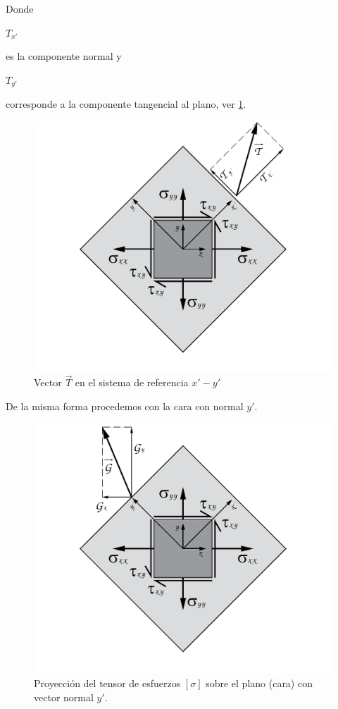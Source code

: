 \documentclass[12pt,letterpaper, twoside, openany]{article}
\begin{document}
%
Donde \begin{large} $T_{x'}$\end{large} es la componente normal y \begin{large} $T_{y'}$\end{large} corresponde a la componente tangencial al plano, ver \cref{fig:TPxpyp}.
%
\begin{figure}[H]
	\centering
		\includegraphics[width=12 cm]{img/Proyecta_CaraXpProXpYp.pdf}
		\caption{Vector $\overset{\rightarrow}{T}$ en el sistema de referencia $x'-y'$}
		\label{fig:TPxpyp}
\end{figure}
%
De la misma forma procedemos con la cara con normal $y'$.
%
\begin{figure}[H]
	\centering
		\includegraphics[width=12 cm]{img/Proyecta_CaraYp.pdf}
		\caption{Proyección del tensor de esfuerzos $\left[ \sigma \right]$ sobre el plano (cara) con vector normal $y'$.}
		\label{fig:proycarayp}
\end{figure}
\end{document}
